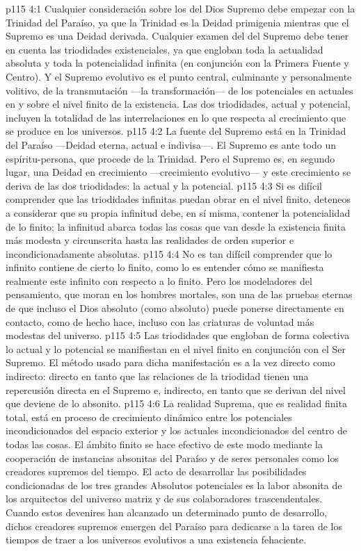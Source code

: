 \vs p115 4:1 Cualquier consideración sobre los  del Dios Supremo debe empezar con la Trinidad del Paraíso, ya que la Trinidad es la Deidad primigenia mientras que el Supremo es una Deidad derivada. Cualquier examen del  del Supremo debe tener en cuenta las triodidades existenciales, ya que engloban toda la actualidad absoluta y toda la potencialidad infinita (en conjunción con la Primera Fuente y Centro). Y el Supremo evolutivo es el punto central, culminante y personalmente volitivo, de la transmutación ---la transformación--- de los potenciales en actuales en y sobre el nivel finito de la existencia. Las dos triodidades, actual y potencial, incluyen la totalidad de las interrelaciones en lo que respecta al crecimiento que se produce en los universos.
\vs p115 4:2 La fuente del Supremo está en la Trinidad del Paraíso ---Deidad eterna, actual e indivisa---. El Supremo es ante todo un espíritu\hyp{}persona, que procede de la Trinidad. Pero el Supremo es, en segundo lugar, una Deidad en crecimiento ---crecimiento evolutivo--- y este crecimiento se deriva de las dos triodidades: la actual y la potencial.
\vs p115 4:3 Si es difícil comprender que las triodidades infinitas puedan obrar en el nivel finito, deteneos a considerar que su propia infinitud debe, en sí misma, contener la potencialidad de lo finito; la infinitud abarca todas las cosas que van desde la existencia finita más modesta y circunscrita hasta las realidades de orden superior e incondicionadamente absolutas.
\vs p115 4:4 No es tan difícil comprender que lo infinito contiene de cierto lo finito, como lo es entender cómo se manifiesta realmente este infinito con respecto a lo finito. Pero los modeladores del pensamiento, que moran en los hombres mortales, son una de las pruebas eternas de que incluso el Dios absoluto (como absoluto) puede ponerse directamente en contacto, como de hecho hace, incluso con las criaturas de voluntad más modestas del universo.
\vs p115 4:5 Las triodidades que engloban de forma colectiva lo actual y lo potencial se manifiestan en el nivel finito en conjunción con el Ser Supremo. El método usado para dicha manifestación es a la vez directo como indirecto: directo en tanto que las relaciones de la triodidad tienen una repercusión directa en el Supremo e, indirecto, en tanto que se derivan del nivel que deviene de lo absonito.
\vs p115 4:6 La realidad Suprema, que es realidad finita total, está en proceso de crecimiento dinámico entre los potenciales incondicionados del espacio exterior y los actuales incondicionados del centro de todas las cosas. El ámbito finito se hace efectivo de este modo mediante la cooperación de instancias absonitas del Paraíso y de seres personales como los creadores supremos del tiempo. El acto de desarrollar las posibilidades condicionadas de los tres grandes Absolutos potenciales es la labor absonita de los arquitectos del universo matriz y de sus colaboradores trascendentales. Cuando estos devenires han alcanzado un determinado punto de desarrollo, dichos creadores supremos emergen del Paraíso para dedicarse a la tarea de los tiempos de traer a los universos evolutivos a una existencia fehaciente.
